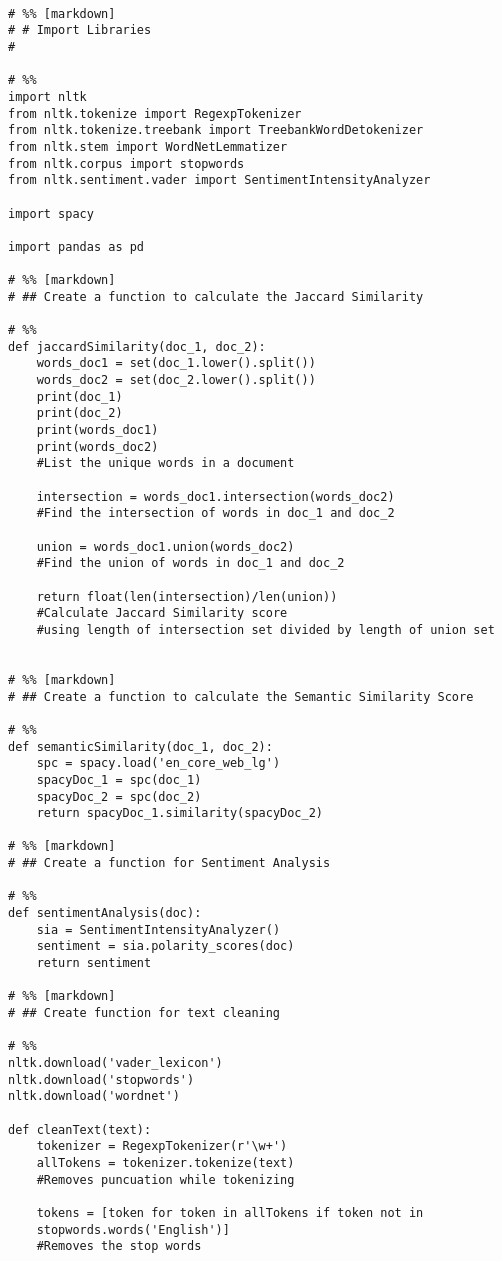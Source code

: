 \documentclass{article}
\begin{document}
\begin{verbatim}

# %% [markdown]
# # Import Libraries
# 

# %%
import nltk
from nltk.tokenize import RegexpTokenizer
from nltk.tokenize.treebank import TreebankWordDetokenizer
from nltk.stem import WordNetLemmatizer
from nltk.corpus import stopwords
from nltk.sentiment.vader import SentimentIntensityAnalyzer

import spacy

import pandas as pd

# %% [markdown]
# ## Create a function to calculate the Jaccard Similarity

# %%
def jaccardSimilarity(doc_1, doc_2):
    words_doc1 = set(doc_1.lower().split())
    words_doc2 = set(doc_2.lower().split())
    print(doc_1)
    print(doc_2)
    print(words_doc1)
    print(words_doc2)
    #List the unique words in a document

    intersection = words_doc1.intersection(words_doc2)
    #Find the intersection of words in doc_1 and doc_2

    union = words_doc1.union(words_doc2)
    #Find the union of words in doc_1 and doc_2

    return float(len(intersection)/len(union))
    #Calculate Jaccard Similarity score
    #using length of intersection set divided by length of union set


# %% [markdown]
# ## Create a function to calculate the Semantic Similarity Score

# %%
def semanticSimilarity(doc_1, doc_2):
    spc = spacy.load('en_core_web_lg')
    spacyDoc_1 = spc(doc_1)
    spacyDoc_2 = spc(doc_2)
    return spacyDoc_1.similarity(spacyDoc_2)

# %% [markdown]
# ## Create a function for Sentiment Analysis

# %%
def sentimentAnalysis(doc):
    sia = SentimentIntensityAnalyzer()
    sentiment = sia.polarity_scores(doc)
    return sentiment

# %% [markdown]
# ## Create function for text cleaning

# %%
nltk.download('vader_lexicon')
nltk.download('stopwords')
nltk.download('wordnet')

def cleanText(text):
    tokenizer = RegexpTokenizer(r'\w+')
    allTokens = tokenizer.tokenize(text)
    #Removes puncuation while tokenizing

    tokens = [token for token in allTokens if token not in 
    stopwords.words('English')]
    #Removes the stop words


\end{verbatim}
\end{document}
